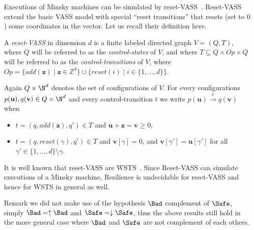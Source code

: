 Executions of Minsky machines can be simulated by reset-VASS~\cite{araki1976PN}. 
Reset-VASS extend the basic VASS model with special “reset
transitions” that resets (set to $0$) some coordinates in the vector. Let us recall their definition here.
\begin{definition}
A {\em reset-VASS} in dimension $d$ %
 is a finite 
labeled directed graph $V = (Q,T)$, where $Q$ will be referred to as the {\em control-states} of $V$, and where 
$T \subseteq Q \times Op \times Q$
 will be referred to as the {\em control-transitions} of $V$,
where $Op = \{ add(\textbf{z}) \mid \textbf{z} \in \mathds{Z}^d\} \cup 
		\{ reset(i) \mid i \in \{1,\ldots,d\} \}$.
\end{definition}

Again $Q \times \N^d$
 denotes the set of configurations of $V$.
For every configurations $p(\textbf{u}), q(\textbf{v}) \in Q \times \N^d$ and every control-transition $t$ we write
$p(\textbf{u}) \xrightarrow{t} q(\textbf{v})$ when 
\begin{samepage}\begin{itemize}
\item  $t = (q,add(\textbf{z}),q') \in T$
and $\textbf{u}+\textbf{z} = \textbf{v} \geq 0$,
\item $t = (q,reset(\gamma),q') \in T$ 
and
$\textbf{v}[\gamma] = 0$, and $\textbf{v}[\gamma'] = \textbf{u}[\gamma']$ for all $\gamma' \in \{1,\ldots, d\} \setminus \gamma$.
\end{itemize} \end{samepage}

It is well known that reset-VASS are WSTS~\cite{dufourd1998reset}. 
Since Reset-VASS can simulate executions of a Minsky machine, {\sc Resilience} is undecidable for reset-VASS and hence for WSTS in general as well.





Remark we did not make use of the hypothesis $\Bad$ complement of $\Safe$, simply 
$\Bad=\uparrow \Bad$ and $\Safe=\downarrow \Safe$, thus 
the above results still hold in the more general case where $\Bad$ and $\Safe$ are not complement of each others.






